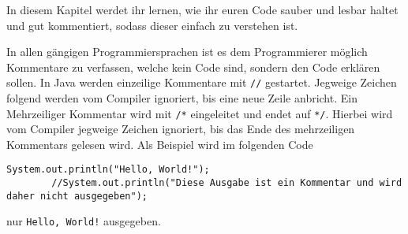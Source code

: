 

In diesem Kapitel werdet ihr lernen, wie ihr euren Code sauber und lesbar haltet und gut kommentiert, sodass dieser einfach zu verstehen ist.

\begin{Infobox}[Kommentare]
    In allen gängigen Programmiersprachen ist es dem Programmierer möglich Kommentare zu verfassen, welche kein Code sind, sondern den Code erklären sollen.
    In Java werden einzeilige Kommentare mit \lstinline{//} gestartet. Jegweige Zeichen folgend werden vom Compiler ignoriert, bis eine neue Zeile anbricht.
    Ein Mehrzeiliger Kommentar wird mit \lstinline{/*} eingeleitet und endet auf \lstinline{*/}. Hierbei wird vom Compiler jegweige Zeichen ignoriert, bis das Ende des mehrzeiligen Kommentars gelesen wird.
    Als Beispiel wird im folgenden Code
    \begin{lstlisting}[breaklines=true, numbers=none]
        System.out.println("Hello, World!");
        //System.out.println("Diese Ausgabe ist ein Kommentar und wird daher nicht ausgegeben");
    \end{lstlisting}
    nur \lstinline{Hello, World!} ausgegeben.
\end{Infobox}

\addexcercise
